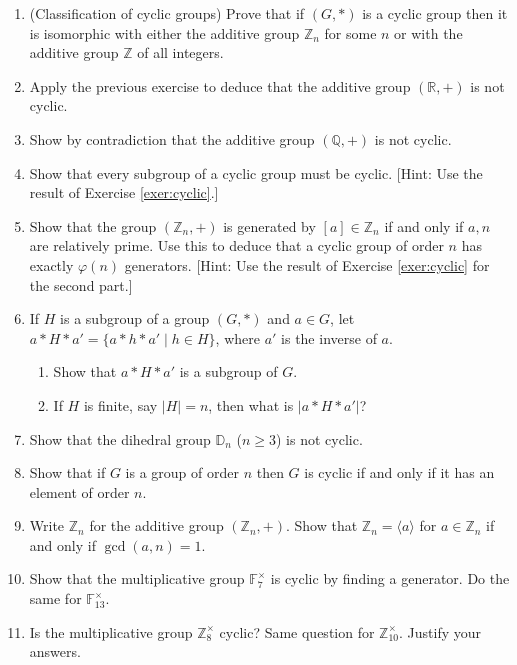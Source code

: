 \documentclass[11pt]{article}
\newenvironment{problems}
{
 \begin{enumerate}[topsep=1pt,itemsep=0pt,parsep=2pt,leftmargin=0.6cm,%
 label={\arabic*.}, ref=\arabic*] \small
}
{
 \end{enumerate}
}
\theoremstyle{definition}
\newcommand{\R}{\mathbb{R}} %
\newcommand{\Z}{\mathbb{Z}} %
\newcommand{\Q}{\mathbb{Q}} %
\newcommand{\F}{{\mathbb F}}
\newcommand{\gen}[1]{\langle #1 \rangle}
\newcommand{\D}{\mathbb{D}}
\begin{document}
\begin{problems}
\item{} \label{exer:cyclic} (Classification of
  cyclic groups) Prove that if $(G,*)$ is a cyclic group then it is
  isomorphic with either the additive group $\Z_n$ for some $n$ or
  with the additive group $\Z$ of all integers.

\item Apply the previous exercise to deduce that the additive group
  $(\R,+)$ is not cyclic. 

\item Show by contradiction that the additive group $(\Q, +)$ is not
  cyclic.

\item Show that every subgroup of a cyclic group must be
  cyclic. [Hint: Use the result of Exercise \ref{exer:cyclic}.]

\item Show that the group $(\Z_n,+)$ is generated by $[a] \in \Z_n$ if
  and only if $a,n$ are relatively prime. Use this to deduce that a
  cyclic group of order $n$ has exactly $\varphi(n)$ generators.
  [Hint: Use the result of Exercise \ref{exer:cyclic} for the second
    part.]


\item If $H$ is a subgroup of a group $(G,*)$ and $a \in G$, let
  $a*H*a' = \{a*h*a' \mid h \in H \}$, where $a'$ is the inverse of
  $a$. 
  \begin{enumerate}
  \item Show that $a*H*a'$ is a subgroup of $G$. 
  \item If $H$ is finite, say $|H|=n$, then what is $|a*H*a'|$?
  \end{enumerate}

\item Show that the dihedral group $\D_n$ ($n \ge 3$) is not cyclic.

\item Show that if $G$ is a group of order $n$ then $G$ is cyclic if
  and only if it has an element of order $n$.

\item Write $\Z_n$ for the additive group $(\Z_n,+)$. Show that $\Z_n
  = \gen{a}$ for $a \in \Z_n$ if and only if $\gcd(a,n) = 1$.

\item Show that the multiplicative group $\F_7^\times$ is cyclic by
  finding a generator. Do the same for $\F_{13}^\times$.

\item Is the multiplicative group $\Z_8^\times$ cyclic? Same question
  for $\Z_{10}^\times$. Justify your answers.


\end{problems}
\end{document}
